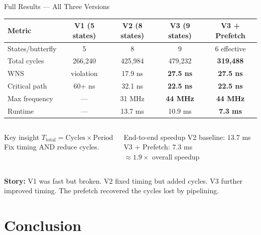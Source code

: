 \documentclass[aspectratio=169, 11pt]{beamer}
\begin{document}
\begin{frame}{Full Results --- All Three Versions}
\begin{center}
\small
\begin{tabular}{lcccc}
\toprule
\textbf{Metric} & \textbf{V1 (5 states)} & \textbf{V2 (8 states)} & \textbf{V3 (9 states)} & \textbf{V3 + Prefetch} \\
\midrule
States/butterfly   & 5       & 8       & 9       & 6 effective \\
Total cycles       & 266,240 & 425,984 & 479,232 & \textbf{319,488} \\
WNS                & violation & 17.9 ns & \textbf{27.5 ns} & \textbf{27.5 ns} \\
Critical path      & 60+ ns  & 32.1 ns & \textbf{22.5 ns} & \textbf{22.5 ns} \\
Max frequency      & ---     & 31 MHz  & \textbf{44 MHz}  & \textbf{44 MHz}  \\
Runtime            & ---     & 13.7 ms & 10.9 ms & \textbf{7.3 ms}  \\
\bottomrule
\end{tabular}
\end{center}

\vspace{0.3em}
\begin{columns}
\begin{block}{Key insight}
\centering
$T_{\text{total}} = \text{Cycles} \times \text{Period}$\\
Fix timing AND reduce cycles.
\end{block}

\begin{alertblock}{End-to-end speedup}
\centering
V2 baseline: $13.7$ ms\\
V3 + Prefetch: $7.3$ ms\\
$\approx \mathbf{1.9\times}$ overall speedup
\end{alertblock}
\end{columns}

\vspace{0.3em}
\textbf{Story:} V1 was fast but broken. V2 fixed timing but added cycles. V3 further improved timing. The prefetch recovered the cycles lost by pipelining.
\end{frame}

\section{Conclusion}
\end{document}
